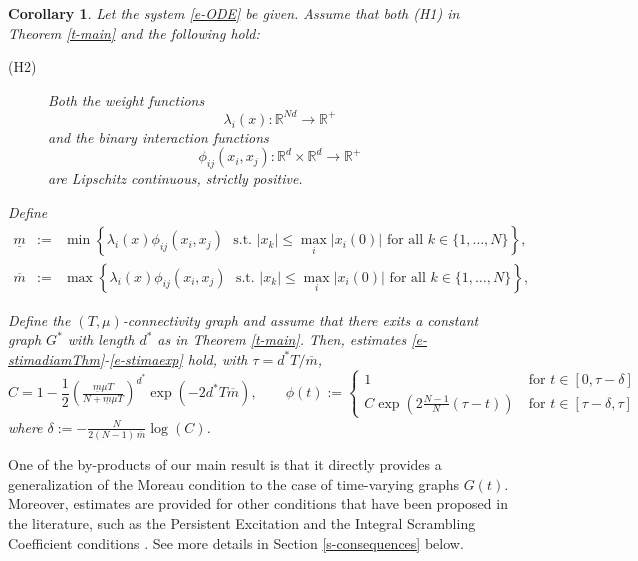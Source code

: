 \documentclass[journal]{article}
\newcommand{\R}{\mathbb{R}}
\newtheorem{corollary}[theorem]{Corollary}
\begin{document}
\begin{corollary} \label{c-main} Let the system \eqref{e-ODE} be given. Assume that both (H1) in Theorem \ref{t-main} and the following hold:
\begin{description}
\item[(H2) \label{hyp:Lip}] Both the weight functions $$\lambda_i(x):\R^{Nd}\to \R^+$$ and the binary interaction functions $$\phi_{ij}(x_i,x_j):\R^d\times\R^d\to \R^+$$ are Lipschitz continuous, strictly positive.
\end{description}

Define
\begin{eqnarray}\underline{m}&:=&\min\left\{\lambda_i(x) \phi_{ij}(x_i,x_j)\mbox{~~s.t.~} |x_k| \leq  \max_i|x_i(0)|\mbox{ for all }k\in\{1,\ldots,N\}\right\},\label{e-um}\\
\overline{m}&:=&\max\left\{\lambda_i(x) \phi_{ij}(x_i,x_j)\mbox{~~s.t.~} |x_k| \leq  \max_i|x_i(0)|\mbox{ for all }k\in\{1,\ldots,N\}\right\},\label{e-om}
 \end{eqnarray}
 
 Define the $(T,\mu)$-connectivity graph and assume that there exits a constant graph $G^*$ with length
 $d^*$ as in Theorem \ref{t-main}. Then, estimates \eqref{e-stimadiamThm}-\eqref{e-stimaexp} hold, with $\tau=d^*T/\overline{m}$, 
$$C=1-\frac12\left( \tfrac{\underline{m}\mu T}{N+\underline{m}\mu T}    \right)^{d^*}\exp(-2d^*T\overline{m}),\qquad
\phi(t):= \begin{cases}
1&~\mbox{for $t\in[0,\tau-\delta]$}\\
C\exp\left(2\frac{N-1}N(\tau-t)\right)&~\mbox{for $t\in[\tau-\delta,\tau]$}
\end{cases}$$
where $\delta:=-\frac{N}{2(N-1) \,\overline{m}}\log(C)$.
\end{corollary}


One of the by-products of our main result is that it directly provides a generalization of the Moreau condition to the case of time-varying graphs $G(t)$. Moreover, estimates are provided for other conditions that have been proposed in the literature, such as the Persistent Excitation \cite{narendra2012stable,ChSi2010,ChSi2014,ren2008distributed,tang2020bearing,manfredi2016criterion,bonnet2021consensus,anderson2016convergence,chaillet2008uniform}
 and the Integral Scrambling Coefficient conditions \cite{bonnet2023consensus,bonnet2022consensus}. See more details in Section \ref{s-consequences} below.
 
\end{document}
